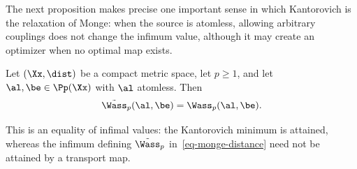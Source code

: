 The next proposition makes precise one important sense in which Kantorovich is the relaxation of Monge: when the source is atomless, allowing arbitrary couplings does not change the infimum value, although it may create an optimizer when no optimal map exists.

\begin{prop}\label{prop-kantorovich-relaxation-monge}
	Let $(\Xx,\dist)$ be a compact metric space, let $p\geq1$, and let $\al,\be\in\Pp(\Xx)$ with $\al$ atomless. Then
	\[
		\tilde\Wass_p(\al,\be)=\Wass_p(\al,\be).
	\]
\end{prop}
This is an equality of infimal values: the Kantorovich minimum is attained, whereas the infimum defining $\tilde\Wass_p$ in~\eqref{eq-monge-distance} need not be attained by a transport map.
